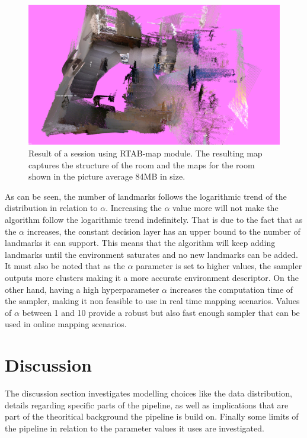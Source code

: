 \documentclass[twoside,hidelinks]{article}
\begin{document}
\begin{figure}[ht!]
  \centering
    \includegraphics[width=.8\textwidth]{rtabmap}
    \caption{Result of a session using RTAB-map module. The resulting map captures the structure of the room and the maps for the room shown in the picture average 84MB in size.}
  \label{rtabmap}
\end{figure}

As can be seen, the number of landmarks follows the logarithmic trend of the distribution in relation to $\alpha$.
Increasing the $\alpha$ value more will not make the algorithm follow the logarithmic trend indefinitely. 
That is due to the fact that as the $\alpha$ increases, the constant decision layer has an upper bound to the number of landmarks it can support. 
This means that the algorithm will keep adding landmarks until the environment saturates and no new landmarks can be added.
It must also be noted that as the $\alpha$ parameter is set to higher values, the sampler outputs more clusters making it a more accurate environment descriptor.
On the other hand, having a high hyperparameter $\alpha$ increases the computation time of the sampler, making it non feasible to use in real time mapping scenarios.
Values of $\alpha$ between 1 and 10 provide a robust but also fast enough sampler that can be used in online mapping scenarios.


\newpage
\section{Discussion}
\label{sec:discussion}

The discussion section investigates modelling choices like the data distribution, details regarding specific parts of the pipeline, as well as implications that are part of the theoritical background the pipeline is build on. Finally some limits of the pipeline in relation to the parameter values it uses are investigated.
\end{document}
